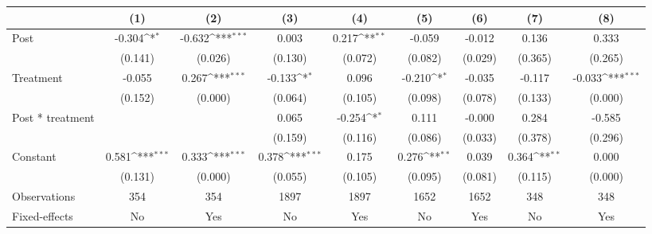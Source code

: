 {
\def\sym#1{\ifmmode^{#1}\else\(^{#1}\)\fi}
\begin{tabular}{l*{8}{c}}
\hline\hline
                    &\multicolumn{1}{c}{(1)}&\multicolumn{1}{c}{(2)}&\multicolumn{1}{c}{(3)}&\multicolumn{1}{c}{(4)}&\multicolumn{1}{c}{(5)}&\multicolumn{1}{c}{(6)}&\multicolumn{1}{c}{(7)}&\multicolumn{1}{c}{(8)}\\
                    
\hline
Post        &      -0.304\sym{*}  &      -0.632\sym{***}&       0.003         &       0.217\sym{**} &      -0.059         &      -0.012         &       0.136         &       0.333         \\
                    &     (0.141)         &     (0.026)         &     (0.130)         &     (0.072)         &     (0.082)         &     (0.029)         &     (0.365)         &     (0.265)         \\
[1em]
Treatment     &      -0.055         &       0.267\sym{***}&      -0.133\sym{*}  &       0.096         &      -0.210\sym{*}  &      -0.035         &      -0.117         &      -0.033\sym{***}\\
                    &     (0.152)         &     (0.000)         &     (0.064)         &     (0.105)         &     (0.098)         &     (0.078)         &     (0.133)         &     (0.000)         \\
[1em]
Post * treatment &               &               &       0.065         &      -0.254\sym{*}  &       0.111         &      -0.000         &       0.284         &      -0.585         \\
                    &                 &                &     (0.159)         &     (0.116)         &     (0.086)         &     (0.033)         &     (0.378)         &     (0.296)         \\
[1em]
Constant            &       0.581\sym{***}&       0.333\sym{***}&       0.378\sym{***}&       0.175         &       0.276\sym{**} &       0.039         &       0.364\sym{**} &       0.000         \\
                    &     (0.131)         &     (0.000)         &     (0.055)         &     (0.105)         &     (0.095)         &     (0.081)         &     (0.115)         &     (0.000)         \\
\hline
Observations        &         354         &         354         &        1897         &        1897         &        1652         &        1652         &         348         &         348         \\
Fixed-effects  &          No         &         Yes         &          No         &         Yes         &          No         &         Yes         &          No         &         Yes         \\


\end{tabular}}
